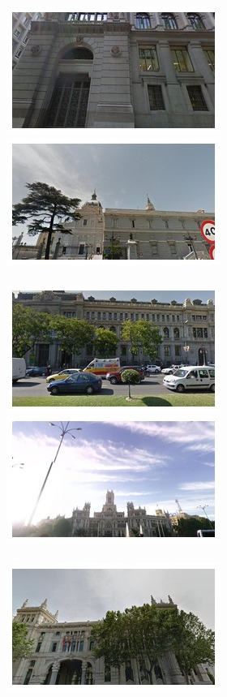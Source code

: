 \begin{figure}[t]
\begin{minipage}{\linewidth}
\begin{minipage}{0.3\linewidth}
      \includegraphics[width=0.49\linewidth]{imgs/arch/mosaicsS1/mosaic0002.jpg}
      \includegraphics[width=0.49\linewidth]{imgs/arch/mosaicsS1/mosaic0006.jpg}
      \\ \vspace{-3mm} \\
      \includegraphics[width=0.49\linewidth]{imgs/arch/mosaicsS1/mosaic0009.jpg}
      \includegraphics[width=0.49\linewidth]{imgs/arch/mosaicsS1/mosaic0018.jpg}
      \\ \vspace{-3mm} \\
      \includegraphics[width=0.49\linewidth]{imgs/arch/mosaicsS1/mosaic0021.jpg}

\end{minipage}
\end{minipage}
\end{figure}
